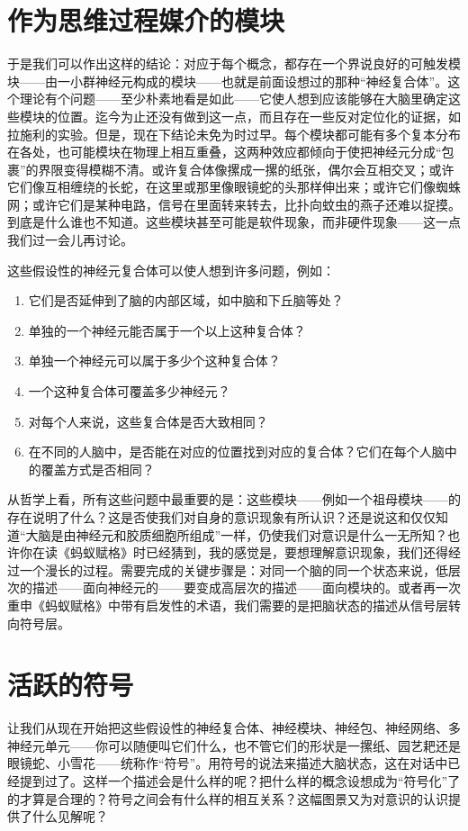 \section{作为思维过程媒介的模块}

于是我们可以作出这样的结论：对应于每个概念，都存在一个界说良好的可触发模块——由一小群神经元构成的模块——也就是前面设想过的那种“神经复合体”。这个理论有个问题——至少朴素地看是如此——它使人想到应该能够在大脑里确定这些模块的位置。迄今为止还没有做到这一点，而且存在一些反对定位化的证据，如拉施利的实验。但是，现在下结论未免为时过早。每个模块都可能有多个复本分布在各处，也可能模块在物理上相互重叠，这两种效应都倾向于使把神经元分成“包裹”的界限变得模糊不清。或许复合体像摞成一摞的纸张，偶尔会互相交叉；或许它们像互相缠绕的长蛇，在这里或那里像眼镜蛇的头那样伸出来；或许它们像蜘蛛网；或许它们是某种电路，信号在里面转来转去，比扑向蚊虫的燕子还难以捉摸。到底是什么谁也不知道。这些模块甚至可能是软件现象，而非硬件现象——这一点我们过一会儿再讨论。

这些假设性的神经元复合体可以使人想到许多问题，例如：
\begin{enumerate}
\item 它们是否延伸到了脑的内部区域，如中脑和下丘脑等处？
\item 单独的一个神经元能否属于一个以上这种复合体？
\item 单独一个神经元可以属于多少个这种复合体？
\item 一个这种复合体可覆盖多少神经元？
\item 对每个人来说，这些复合体是否大致相同？
\item 在不同的人脑中，是否能在对应的位置找到对应的复合体？它们在每个人脑中的覆盖方式是否相同？
\end{enumerate}

从哲学上看，所有这些问题中最重要的是：这些模块——例如一个祖母模块——的存在说明了什么？这是否使我们对自身的意识现象有所认识？还是说这和仅仅知道“大脑是由神经元和胶质细胞所组成”一样，仍使我们对意识是什么一无所知？也许你在读《蚂蚁赋格》时已经猜到，我的感觉是，要想理解意识现象，我们还得经过一个漫长的过程。需要完成的关键步骤是：对同一个脑的同一个状态来说，低层次的描述——面向神经元的——要变成高层次的描述——面向模块的。或者再一次重申《蚂蚁赋格》中带有启发性的术语，我们需要的是把脑状态的描述从信号层转向符号层。

\section{活跃的符号}

让我们从现在开始把这些假设性的神经复合体、神经模块、神经包、神经网络、多神经元单元——你可以随便叫它们什么，也不管它们的形状是一摞纸、园艺耙还是眼镜蛇、小雪花——统称作“符号”。用符号的说法来描述大脑状态，这在对话中已经提到过了。这样一个描述会是什么样的呢？把什么样的概念设想成为“符号化”了的才算是合理的？符号之间会有什么样的相互关系？这幅图景又为对意识的认识提供了什么见解呢？

